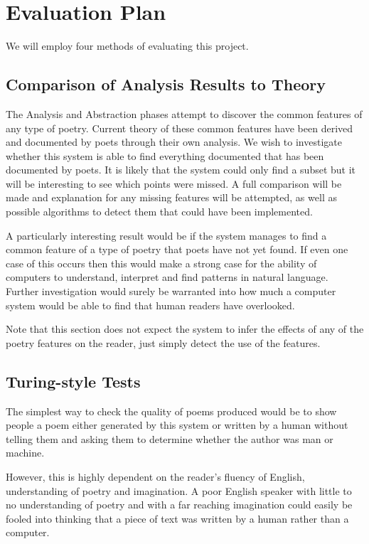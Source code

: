 \chapter{Evaluation Plan}
\ifpdf
    \graphicspath{{Evaluation/EvaluationFigs/PNG/}{Evaluation/EvaluationFigs/PDF/}{Evaluation/EvaluationFigs/}}
\else
    \graphicspath{{Evaluation/EvaluationFigs/EPS/}{Evaluation/EvaluationFigs/}}
\fi

We will employ four methods of evaluating this project.
\section{Comparison of Analysis  Results to Theory}
The Analysis and Abstraction phases attempt to discover the common features of any type of poetry. Current theory of these common features have been derived and documented by poets through their own analysis. We wish to investigate whether this system is able to find everything documented that has been documented by poets. It is likely that the system could only find a subset but it will be interesting to see which points were missed. A full comparison will be made and explanation for any missing features will be attempted, as well as possible algorithms to detect them that could have been implemented. 

A particularly interesting result would be if the system manages to find a common feature of a type of poetry that poets have not yet found. If even one case of this occurs then this would make a strong case for the ability of computers to understand, interpret and find patterns in natural language. Further investigation would surely be warranted into how much a computer system would be able to find that human readers have overlooked.

Note that this section does not expect the system to infer the effects of any of the poetry features on the reader, just simply detect the use of the features.

\section{Turing-style Tests}
The simplest way to check the quality of poems produced would be to show people a poem either generated by this system or written by a human without telling them and asking them to determine whether the author was man or machine.

However, this is highly dependent on the reader's fluency of English, understanding of poetry and imagination. A poor English speaker with little to no understanding of poetry and with a far reaching imagination could easily be fooled into thinking that a piece of text was written by a human rather than a computer.

